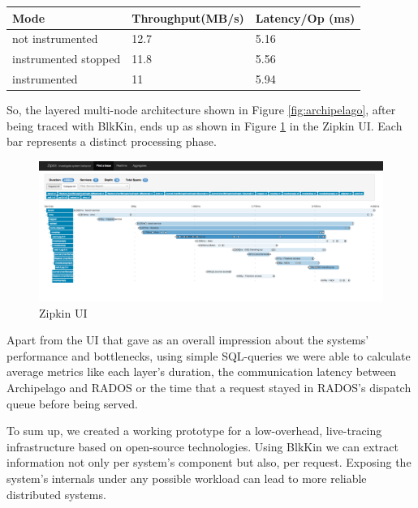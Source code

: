 \documentclass[11pt,journal,compsoc]{IEEEtran}
\begin{document}
\begin{center}
\begin{tabular}{| l | p{3cm} | p{2cm} |}
    \hline
    Mode & Throughput(MB/s) & Latency/Op (ms)  \\ \hline
    not instrumented & 12.7 & 5.16  \\ \hline
    instrumented stopped & 11.8 &  5.56  \\ \hline
    instrumented & 11 & 5.94  \\
    \hline
    \end{tabular}
\end{center}

So, the layered multi-node architecture shown in Figure \ref{fig:archipelago},
after being traced with BlkKin, ends up as shown in Figure \ref{fig:zipkin} in
the Zipkin UI. Each bar represents a distinct processing phase.

\begin{center}
\begin{figure}[h!]
  \centering
  \includegraphics[scale=0.15]{figs/zipkin.png}
  \caption{Zipkin UI}
  \label{fig:zipkin}
\end{figure}
\end{center}
Apart from the UI that gave as an overall impression about the systems'
performance and bottlenecks, using simple SQL-queries we were able to calculate
average metrics like each layer's duration, the communication latency between
Archipelago and RADOS or the time that a request stayed in RADOS's dispatch
queue before being served.

To sum up, we created a working prototype for a low-overhead, live-tracing
infrastructure based on open-source technologies. Using BlkKin we can extract
information not only per system's component but also, per request. Exposing the
system's internals under any possible workload can lead to more reliable
distributed systems.



\end{document}
